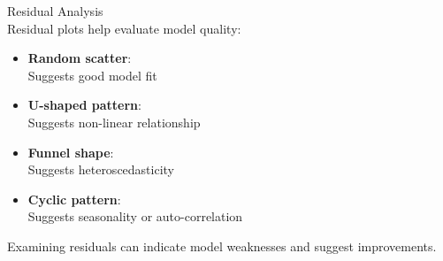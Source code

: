 \begin{corollary}{Residual Analysis}\\
Residual plots help evaluate model quality:
\begin{itemize}
    \item \textbf{Random scatter}: \\Suggests good model fit
    \item \textbf{U-shaped pattern}: \\ Suggests non-linear relationship
    \item \textbf{Funnel shape}: \\ Suggests heteroscedasticity
    \item \textbf{Cyclic pattern}: \\ Suggests seasonality or auto-correlation
\end{itemize}
\vspace{1mm}
Examining residuals can indicate model weaknesses and suggest improvements.
\end{corollary}

\multend


